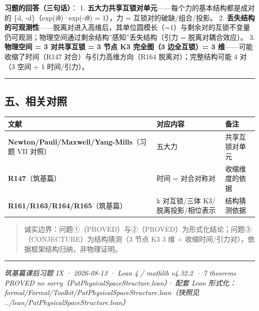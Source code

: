\documentclass[
]{article}
\newcounter{none} %
\begin{document}
\textbf{习题的回答（三句话）}： 1.
\textbf{五大力共享互锁对单元}------每个力的基本结构都是成对的 \{d,
-d\}（exp(iθ)·exp(-iθ) = 1），力 = 互锁对的破缺/组合/投影。 2.
\textbf{丢失结构的可观测性}------脱离对进入高维后，其单位圆模长（=1）与剩余对的互锁不变量仍可观测；物理空间通过剩余结构''感知''丢失结构（引力
= 脱离对耦合效应）。 3. \textbf{物理空间 = 3 对共享互锁 = 3 节点 K3
完全图（3 边全互锁）= 3 维}------可能收缩了时间（R147
对合）与引力高维方向（R164 脱离对）；完整结构可能 4 对（3 空间 + 1
时间/引力）。

\begin{center}\rule{0.5\linewidth}{0.5pt}\end{center}

\subsection{五、相关对照}\label{ux4e94ux76f8ux5173ux5bf9ux7167}

{\def\LTcaptype{none} %
\begin{longtable}[]{@{}
  >{\raggedright\arraybackslash}p{}
  >{\raggedright\arraybackslash}p{}
  >{\raggedright\arraybackslash}p{}@{}}
\toprule\noalign{}
\begin{minipage}[b]{\linewidth}\raggedright
文献
\end{minipage} & \begin{minipage}[b]{\linewidth}\raggedright
对应内容
\end{minipage} & \begin{minipage}[b]{\linewidth}\raggedright
备注
\end{minipage} \\
\midrule\noalign{}
\endhead
\bottomrule\noalign{}
\endlastfoot
\textbf{Newton/Pauli/Maxwell/Yang-Mills}（习题 VII 对照） & 五大力 &
共享互锁对单元 \\
\textbf{R147}（筑基篇） & 时间 = 对合对称对 & 收缩维度的依据 \\
\textbf{R161/R163/R164/R165}（筑基篇） & k 对互锁/三体
K3/脱离投影/相位表示 & 结构猜测依据 \\
\end{longtable}
}

\begin{quote}
诚实边界：问题①（PROVED）与②（PROVED）为形式化结论；问题③（CONJECTURE）为结构猜测（3
节点 K3 3 维 + 收缩时间/引力对），依据框架结构归纳，非物理证明。
\end{quote}

\begin{center}\rule{0.5\linewidth}{0.5pt}\end{center}

\emph{筑基篇课后习题 IX · 2026-08-13 · Lean 4 / mathlib v4.32.2 · 7
theorems PROVED no sorry（PatPhysicalSpaceStructure.lean）· 配套 Lean
形式化：formal/Formal/Toolkit/PatPhysicalSpaceStructure.lean（快照见
../lean/PatPhysicalSpaceStructure.lean）}
\end{document}
